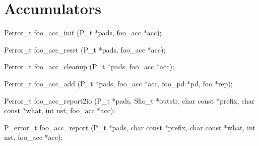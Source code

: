 \chapter{Accumulators}
\label{chap:accumulators}
\begin{code}
Perror_t foo_acc_init (P_t *pads, foo_acc *acc);

Perror_t foo_acc_reset (P_t *pads, foo_acc *acc);

Perror_t foo_acc_cleanup (P_t *pads, foo_acc *acc);

Perror_t foo_acc_add (P_t *pads, foo_acc *acc, foo_pd *pd, foo *rep);

Perror_t foo_acc_report2io (P_t *pads, Sfio_t *outstr, 
                            char const *prefix, char const *what, 
                            int nst, foo_acc *acc);

P_error_t foo_acc_report (P_t *pads, char const *prefix, 
                          char const *what, int nst, foo_acc *acc);

\end{code}

